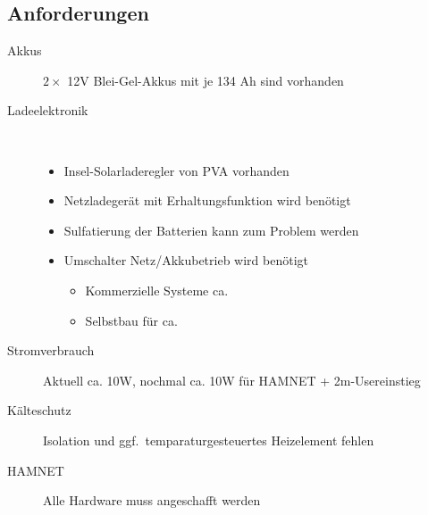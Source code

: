 \documentclass[a4paper]{scrartcl}
\begin{document}
\subsection{Anforderungen}
\begin{description}
    \item[Akkus] $2\times$ 12V Blei-Gel-Akkus mit je 134 Ah sind vorhanden
    \item[Ladeelektronik] ~
        \begin{itemize}
            \item Insel-Solarladeregler von PVA vorhanden
            \item Netzladeger\"at mit Erhaltungsfunktion wird ben\"otigt
            \item Sulfatierung der Batterien kann zum Problem werden
            \item Umschalter Netz/Akkubetrieb wird ben\"otigt
                \begin{itemize}
                    \item Kommerzielle Systeme ca. 
                    \item Selbstbau f\"ur ca. 
                \end{itemize}
        \end{itemize}
    \item[Stromverbrauch] Aktuell ca. 10W, nochmal ca. 10W f\"ur HAMNET + 2m-Usereinstieg
    \item[K\"alteschutz] Isolation und ggf.\ temparaturgesteuertes Heizelement fehlen
    \item[HAMNET] Alle Hardware muss angeschafft werden
\end{description}
\end{document}
